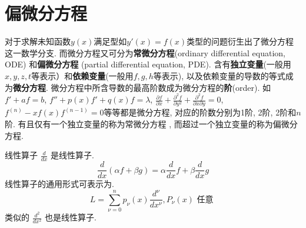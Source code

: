 \chapter{偏微分方程}
对于求解未知函数$y(x)$满足型如$y'(x) = f(x)$类型的问题衍生出了微分方程这一数学分支. 而微分方程又可分为\textbf{常微分方程}(ordinary differential equation, ODE)
和\textbf{偏微分方程} (partial differential equation, PDE).
含有\textbf{独立变量}(一般用$x,y,z, t$等表示）和\textbf{依赖变量}(一般用$f,g,h$等表示), 以及依赖变量的导数的等式成为\textbf{微分方程}.
微分方程中所含导数的最高阶数成为微分方程的\textbf{阶}(order).
如 $f' +  a f = b$, $f'' + p(x) f' + q(x) f = \lambda$, $\frac{\partial f}{\partial x} + \frac{\partial ^2f}{\partial y^2}  +\frac{\partial ^2f}{\partial x \partial y} = 0 $, 
$f^{(n)}  - x f(x) f^{(n-1)} = 0$等等都是微分方程, 对应的阶数分别为1阶, 2阶, 2阶和$n$阶. 有且仅有一个独立变量的称为常微分方程 , 而超过一个独立变量的称为偏微分方程.

线性算子
$\frac{d}{d x}$ 是线性算子.
$$
\frac{d}{d x}(\alpha f+\beta g)=\alpha \frac{d}{d x} f +\beta \frac{d}{d x} g
$$
线性算子的通用形式可表示为.
$$
L=\sum_{\nu=0}^n p_\nu(x) \frac{d^\nu}{d x^\nu}, P_\nu(x) \text { 任意 }
$$
类似的 $\frac{d^2}{d x^2}$ 也是线性算子.



